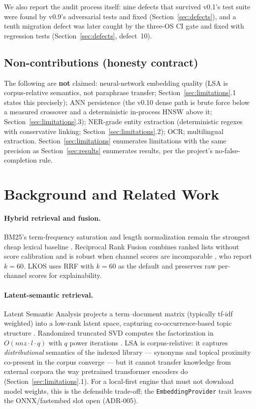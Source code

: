 We also report the audit process itself: nine defects that survived v0.1's
test suite were found by v0.9's adversarial tests and fixed
(Section~\ref{sec:defects}), and a tenth migration defect was later caught by
the three-OS CI gate and fixed with regression tests
(Section~\ref{sec:defects}, defect~10).

\subsection{Non-contributions (honesty contract)}\label{sec:noncontributions}

The following are \textbf{not} claimed: neural-network embedding quality (LSA
is corpus-relative semantics, not paraphrase transfer;
Section~\ref{sec:limitations}.1 states this precisely); ANN persistence (the
v0.10 dense path is brute force below a measured crossover and a deterministic
in-process HNSW \cite{malkov2018} above it; Section~\ref{sec:limitations}.3);
NER-grade entity extraction (deterministic regexes with conservative linking;
Section~\ref{sec:limitations}.2); OCR; multilingual extraction.
Section~\ref{sec:limitations} enumerates limitations with the same precision
as Section~\ref{sec:results} enumerates results, per the project's
no-false-completion rule.

\needspace{0.2\textheight}
\section{Background and Related Work}\label{sec:background}

\paragraph{Hybrid retrieval and fusion.}
BM25's term-frequency saturation and length normalization remain the
strongest cheap lexical baseline \cite{robertson2009}. Reciprocal Rank Fusion
combines ranked lists without score calibration and is robust when channel
scores are incomparable \cite{cormack2009}, who report $k=60$. LKOS uses RRF
with $k=60$ as the default and preserves raw per-channel scores for
explainability.

\paragraph{Latent-semantic retrieval.}
Latent Semantic Analysis projects a term--document matrix (typically tf-idf
weighted) into a low-rank latent space, capturing co-occurrence-based topic
structure \cite{deerwester1990}. Randomized truncated SVD computes the
factorization in $O(\mathit{nnz}\cdot l\cdot q)$ with $q$ power iterations
\cite{halko2011}. LSA is corpus-relative: it captures \emph{distributional}
semantics of the indexed library --- synonyms and topical proximity
co-present in the corpus converge --- but it cannot transfer knowledge from
external corpora the way pretrained transformer encoders do
\cite{karpukhin2020} (Section~\ref{sec:limitations}.1). For a local-first
engine that must not download model weights, this is the defensible
trade-off; the \texttt{EmbeddingProvider} trait leaves the ONNX/fastembed
slot open (ADR-005).

